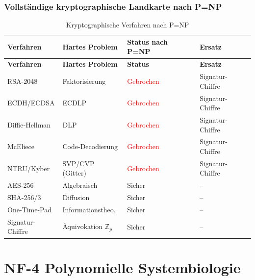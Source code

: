﻿\documentclass[a4paper,12pt]{scrreprt}
\theoremstyle{definition}
\begin{document}
\section{Vollständige kryptographische Landkarte nach P=NP}

\begin{longtable}{p{3.5cm}p{3cm}p{4.5cm}p{3cm}}
\caption{Kryptographische Verfahren nach P=NP}
\label{tab:nf3_krypto}\\
\toprule
\textbf{Verfahren} & \textbf{Hartes Problem} & \textbf{Status nach P=NP} & \textbf{Ersatz} \\
\midrule
\endfirsthead
\toprule
\textbf{Verfahren} & \textbf{Hartes Problem} & \textbf{Status} & \textbf{Ersatz} \\
\midrule
\endhead
\bottomrule
\endfoot
RSA-2048        & Faktorisierung    & \textcolor{red}{Gebrochen}  & Signatur-Chiffre \\
ECDH/ECDSA      & ECDLP             & \textcolor{red}{Gebrochen}  & Signatur-Chiffre \\
Diffie-Hellman  & DLP               & \textcolor{red}{Gebrochen}  & Signatur-Chiffre \\
McEliece        & Code-Decodierung  & \textcolor{red}{Gebrochen}  & Signatur-Chiffre \\
NTRU/Kyber      & SVP/CVP (Gitter)  & \textcolor{red}{Gebrochen}  & Signatur-Chiffre \\
AES-256         & Algebraisch       & \textcolor{green!60!black}{Sicher} & -- \\
SHA-256/3       & Diffusion         & \textcolor{green!60!black}{Sicher} & -- \\
One-Time-Pad    & Informationstheo. & \textcolor{green!60!black}{Sicher} & -- \\
Signatur-Chiffre & Äquivokation $\mathbb{Z}_p$ & \textcolor{green!60!black}{Sicher} & -- \\
\end{longtable}

\part{NF-4 \quad Polynomielle Systembiologie}
\label{part:nf4}
\end{document}
